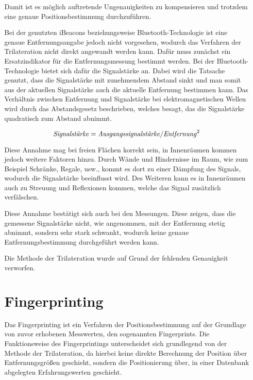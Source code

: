 Damit ist es möglich auftretende Ungenauigkeiten zu kompensieren und trotzdem eine genaue Positionsbestimmung durchzuführen.

Bei der genutzten iBeacons beziehungsweise Bluetooth-Technologie ist eine genaue Entfernungsangabe jedoch nicht vorgesehen, wodurch das Verfahren der Trilateration nicht direkt angewandt werden kann. Dafür muss zunächst ein Ersatzindikator für die Entfernungsmessung bestimmt werden.
Bei der Bluetooth-Technologie bietet sich dafür die Signalstärke an.
Dabei wird die Tatsache genutzt, dass die Signalstärke mit zunehmendem Abstand sinkt und man somit aus der aktuellen Signalstärke auch die aktuelle Entfernung bestimmen kann. 
Das Verhältnis zwischen Entfernung und Signalstärke bei elektromagnetischen Wellen wird durch das Abstandsgesetz beschrieben, welches besagt, das die Signalstärke quadratisch zum Abstand abnimmt.

\begin{equation}
	\text{\emph{Signalstärke}} = \text{\emph{Ausgangssignalstärke}}/\text{\emph{Entfernung}}^2
\end{equation}

Diese Annahme mag bei freien Flächen korrekt sein, in Innenräumen kommen jedoch weitere Faktoren hinzu. 
Durch Wände und Hindernisse im Raum, wie zum Beispiel Schränke, Regale, usw., kommt es dort zu einer Dämpfung des Signals, wodurch die Signalstärke beeinflusst wird. Des Weiteren kann es in Innenräumen auch zu Streuung und Reflexionen kommen, welche das Signal zusätzlich verfälschen.

Diese Annahme bestätigt sich auch bei den Messungen. Diese zeigen, dass die gemessene Signalstärke nicht, wie angenommen, mit der Entfernung stetig abnimmt, sondern sehr stark schwankt, wodurch keine genaue Entfernungsbestimmung durchgeführt werden kann.

Die Methode der Trilateration wurde auf Grund der fehlenden Genauigkeit verworfen. 

\section{Fingerprinting}
\label{sec:implementation:fingerprinting}
Das Fingerprinting ist ein Verfahren der Positionsbestimmung auf der Grundlage von zuvor erhobenen Messwerten, den sogenannten Fingerprints.
Die Funktionsweise des Fingerprintings unterscheidet sich grundlegend von der Methode der Trilateration, da hierbei keine direkte Berechnung der Position über Entfernungsgrößen geschieht, sondern die Positionierung über, in einer Datenbank abgelegten Erfahrungswerten geschieht.

